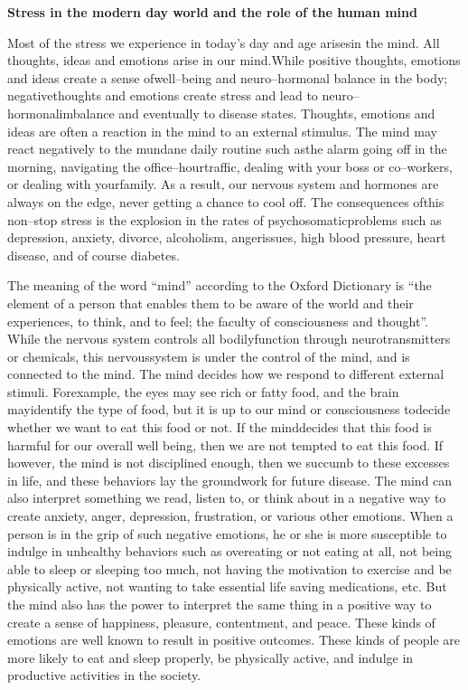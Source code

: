 \noindent\textbf{Stress in the modern day world and the role of the human mind}

Most of the stress we experience in today’s day and age arises\break in the mind. All thoughts, ideas and emotions arise in our mind.\break While positive thoughts, emotions and ideas create a sense of\break well–being and neuro–hormonal balance in the body; negative\break thoughts and emotions create stress and lead to neuro–hormonal\break imbalance and eventually to disease states. Thoughts, emotions and ideas are often a reaction in the mind to an external stimulus. The mind may react negatively to the mundane daily routine such as\break the alarm going off in the morning, navigating the office–hour\break traffic, dealing with your boss or co–workers, or dealing with your\break family. As a result, our nervous system and hormones are always on the edge, never getting a chance to cool off. The consequences of\break this non–stop stress is the explosion in the rates of psychosomatic\break problems such as depression, anxiety, divorce, alcoholism, anger\break issues, high blood pressure, heart disease, and of course diabetes.

The meaning of the word “mind” according to the Oxford Dictionary is “the element of a person that enables them to be aware of the world and their experiences, to think, and to feel; the faculty of consciousness and thought”. While the nervous system controls all bodily\break function through neurotransmitters or chemicals, this nervous\break system is under the control of the mind, and is connected to the mind. The mind decides how we respond to different external stimuli. For\break example, the eyes may see rich or fatty food, and the brain may\break identify the type of food, but it is up to our mind or consciousness to\break decide whether we want to eat this food or not. If the mind\break decides that this food is harmful for our overall well being, then we are not tempted to eat this food. If however, the mind is not disciplined enough, then we succumb to these excesses in life, and these behaviors lay the groundwork for future disease. The mind can also interpret something we read, listen to, or think about in a negative way to create anxiety, anger, depression, frustration, or various other emotions. When a person is in the grip of such negative emotions, he or she is more susceptible to indulge in unhealthy behaviors such as overeating or not eating at all, not being able to sleep or sleeping too much, not having the motivation to exercise and be physically active, not wanting to take essential life saving medications, etc. But the mind also has the power to interpret the same thing in a positive way to create a sense of happiness, pleasure, contentment, and peace. These kinds of emotions are well known to result in positive outcomes. These kinds of people are more likely to eat and sleep properly, be physically active, and indulge in productive activities in the society.

